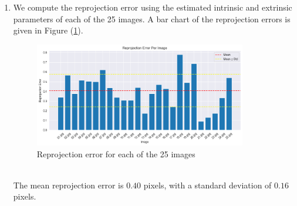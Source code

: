 \documentclass[10pt]{article}
\newcommand{\figref}[1]{Figure (\ref{fig:#1})}
\begin{document}
\begin{enumerate}
        \item We compute the reprojection error using the estimated intrinsic and extrinsic
        parameters of each of the 25 images. A bar chart of the reprojection errors is given
        in \figref{reprojection-error}.
        \begin{figure}[htbp]
            \begin{center}
                \includegraphics[width=0.875\textwidth]{Assets/Question-4/reprojection-error.png}
                \caption{Reprojection error for each of the 25 images}
                \label{fig:reprojection-error}
            \end{center}
        \end{figure}
        \vspace*{0pt} \\
        The mean reprojection error is $0.40$ pixels, with a standard deviation of $0.16$ pixels.


\end{enumerate}
\end{document}
